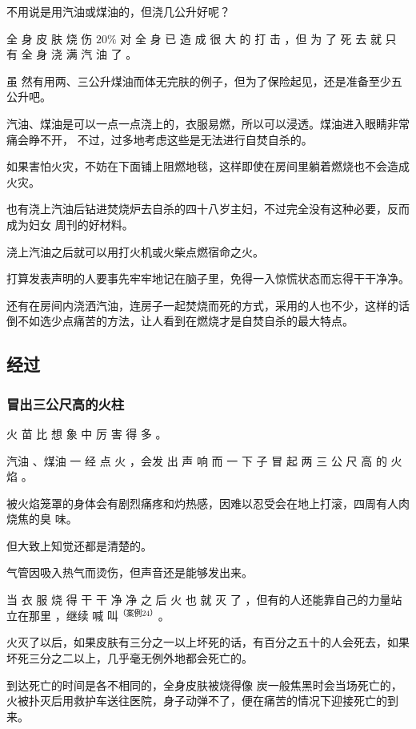 \documentclass[UTF8]{ctexart}
\begin{document}
不用说是用汽油或煤油的，但浇几公升好呢？ 

全 身 皮 肤 烧 伤 $20\%$ 对 全 身 已 造 成 很 大 的 打 击 ，但 为 了 死 去 就 只 有 全 身 浇 满 汽 油 了 。

虽 然有用两、三公升煤油而体无完肤的例子，但为了保险起见，还是准备至少五公升吧。

汽油、煤油是可以一点一点浇上的，衣服易燃，所以可以浸透。煤油进入眼睛非常痛会睁不开，
不过，过多地考虑这些是无法进行自焚自杀的。

如果害怕火灾，不妨在下面铺上阻燃地毯，这样即使在房间里躺着燃烧也不会造成火灾。

也有浇上汽油后钻进焚烧炉去自杀的四十八岁主妇，不过完全没有这种必要，反而成为妇女
周刊的好材料。

浇上汽油之后就可以用打火机或火柴点燃宿命之火。

打算发表声明的人要事先牢牢地记在脑子里，免得一入惊慌状态而忘得干干净净。

还有在房间内浇洒汽油，连房子一起焚烧而死的方式，采用的人也不少，这样的话倒不如选少点痛苦的方法，让人看到在燃烧才是自焚自杀的最大特点。

\subsection{经过}

\subsubsection*{冒出三公尺高的火柱}


火 苗 比 想 象 中 厉 害 得 多 。

汽油 、煤油 一 经 点 火 ，会发 出 声 响 而 一 下 子 冒 起 两 三 公 尺 高 的 火 焰 。

被火焰笼罩的身体会有剧烈痛疼和灼热感，因难以忍受会在地上打滚，四周有人肉烧焦的臭 味。

但大致上知觉还都是清楚的。

气管因吸入热气而烫伤，但声音还是能够发出来。 

当 衣 服 烧 得 干 干 净 净 之 后 火 也 就 灭 了 ，但有的人还能靠自己的力量站立在那里 ，继续 喊 叫$^{（ 案例 24）}$。 

火灭了以后，如果皮肤有三分之一以上坏死的话，有百分之五十的人会死去，如果坏死三分之二以上，几乎毫无例外地都会死亡的。

到达死亡的时间是各不相同的，全身皮肤被烧得像 炭一般焦黑时会当场死亡的，火被扑灭后用救护车送往医院，身子动弹不了，便在痛苦的情况下迎接死亡的到来。
\end{document}
